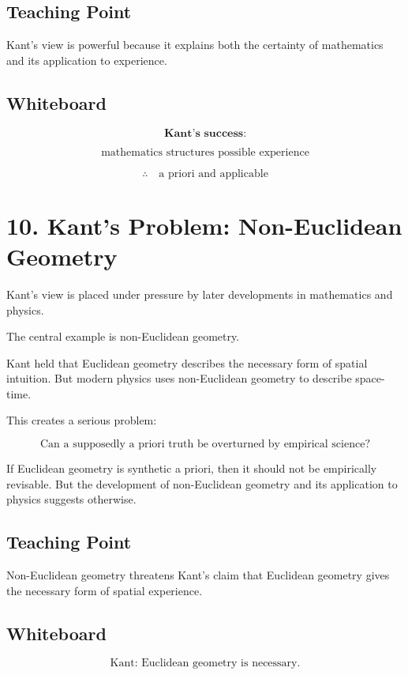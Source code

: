\documentclass[11pt]{article}
\begin{document}
\subsection*{Teaching Point}

Kant's view is powerful because it explains both the certainty of mathematics and its
application to experience.

\subsection*{Whiteboard}

\[
\textbf{Kant's success:}
\]

\[
\text{mathematics structures possible experience}
\]

\[
\therefore
\quad
\text{a priori and applicable}
\]

\section*{10. Kant's Problem: Non-Euclidean Geometry}

Kant's view is placed under pressure by later developments in mathematics and physics.

The central example is non-Euclidean geometry.

Kant held that Euclidean geometry describes the necessary form of spatial intuition. But
modern physics uses non-Euclidean geometry to describe space-time.

This creates a serious problem:

\[
\boxed{
\text{Can a supposedly a priori truth be overturned by empirical science?}
}
\]

If Euclidean geometry is synthetic a priori, then it should not be empirically revisable. But
the development of non-Euclidean geometry and its application to physics suggests
otherwise.

\subsection*{Teaching Point}

Non-Euclidean geometry threatens Kant's claim that Euclidean geometry gives the
necessary form of spatial experience.

\subsection*{Whiteboard}

\[
\text{Kant: Euclidean geometry is necessary.}
\]
\end{document}
